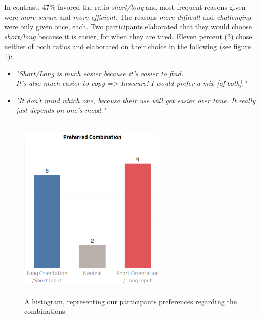 In contrast, 47\% favored the ratio \textit{short/long} and most frequent reasons given were \textit{more secure} and \textit{more efficient}. The reasons \textit{more difficult} and \textit{challenging} were only given once, each. Two participants elaborated that they would choose \textit{short/long} because it is easier, for when they are tired. Eleven percent (2) chose neither of both ratios and elaborated on their choice in the following (see figure \ref{fig:preference}): 
\begin{itemize}
    \item \textit{"Short/Long is much easier because it's easier to find.\\ It's also much easier to copy => Insecure! I would prefer a mix [of both]."}
    \item \textit{"It don't mind which one, because their use will get easier over time. It really just depends on one's mood."} 
\end{itemize}

\begin{figure}[t!]
\centering
\includegraphics[width=7cm, height=9cm]{Chapters/graphics/preference.png}
\caption{A histogram, representing our participants preferences regarding the combinations.}
\label{fig:preference}
\end{figure}

